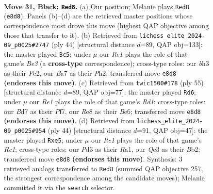 \documentclass[11pt]{article}
\begin{document}
\clearpage

\begin{figure}[p]\centering
\begin{subfigure}{0.46\textwidth}\centering
\resizebox{\linewidth}{!}{%
\newchessgame
\chessboard[
  setfen={r3r2k/bp1b1Qp1/p3p3/7P/8/BPqp3B/P4PKP/R3R3 b - - 0 31},
  showmover=false,
  pgfstyle=straightmove, color=movearrow, markmove={e8-d8}
]}
\caption{}
\end{subfigure}\hfill
\begin{subfigure}{0.46\textwidth}\centering
\resizebox{\linewidth}{!}{%
\newchessgame
\chessboard[
  setfen={1rb2rk1/3n1ppp/3Qp3/1P6/p1B1qPP1/P2RB3/2P4P/1K1R4 w - - 0 23},
  showmover=false,
  pgfstyle=straightmove, color=movearrow, markmove={e3-c5}
]}
\caption{}
\end{subfigure}
\\[4pt]
\begin{subfigure}{0.46\textwidth}\centering
\resizebox{\linewidth}{!}{%
\newchessgame
\chessboard[
  setfen={r2r2k1/5p1p/4bQp1/p2p4/1q6/1B6/PP3PPP/R3R1K1 b - - 5 28},
  showmover=false,
  pgfstyle=straightmove, color=movearrow, markmove={d8-d6}
]}
\caption{}
\end{subfigure}\hfill
\begin{subfigure}{0.46\textwidth}\centering
\resizebox{\linewidth}{!}{%
\newchessgame
\chessboard[
  setfen={r4r1k/1b4pp/8/2p1b3/2Bp4/1P5Q/PB3qPP/R3R2K w - - 0 23},
  showmover=false,
  pgfstyle=straightmove, color=movearrow, markmove={e1-e5}
]}
\caption{}
\end{subfigure}
\caption{\textbf{Move 31, Black: \texttt{Red8}.} (a) Our position; Melanie plays \texttt{Red8} (\texttt{e8d8}). Panels (b)--(d) are the retrieved master positions whose correspondence most drove this move (highest QAP objective among those that transfer to it). (b) Retrieved from \texttt{lichess\_elite\_2024-09\_p0025\#2747} (ply 44) [structural distance $d$=89, QAP obj=133]: the master played \texttt{Bc5}; under $\mu$ our \emph{Re1} plays the role of that game's \emph{Be3} (a \textbf{cross-type} correspondence); cross-type roles: our \emph{b}h3 as their \emph{P}c2, our \emph{B}a7 as their \emph{P}h2; transferred move \texttt{e8d8} \textbf{(endorses this move)}. (c) Retrieved from \texttt{twic1500\#178} (ply 55) [structural distance $d$=89, QAP obj=77]: the master played \texttt{Rd6}; under $\mu$ our \emph{Re1} plays the role of that game's \emph{Rd1}; cross-type roles: our \emph{B}d7 as their \emph{P}f7, our \emph{R}e8 as their \emph{B}e6; transferred move \texttt{e8d8} \textbf{(endorses this move)}. (d) Retrieved from \texttt{lichess\_elite\_2024-09\_p0025\#954} (ply 44) [structural distance $d$=91, QAP obj=47]: the master played \texttt{Rxe5}; under $\mu$ our \emph{Re1} plays the role of that game's \emph{Re1}; cross-type roles: our \emph{P}d3 as their \emph{R}a1, our \emph{Q}c3 as their \emph{B}b2; transferred move \texttt{e8d8} \textbf{(endorses this move)}. Synthesis: 3 retrieved analogs transferred to \texttt{Red8} (summed QAP objective 257, the strongest correspondence among the candidate moves); Melanie committed it via the \texttt{search} selector.}
\label{fig:thought-m61}
\end{figure}
\end{document}
